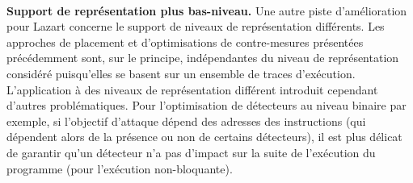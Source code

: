     \paragraph{}
    \textbf{Support de représentation plus bas-niveau.}
    Une autre piste d'amélioration pour Lazart concerne le support de niveaux de représentation différents.
    Les approches de placement et d'optimisations de contre-mesures présentées précédemment sont, sur le principe, indépendantes du niveau de représentation considéré puisqu'elles se basent sur un ensemble de traces d'exécution.
    L'application à des niveaux de représentation différent introduit cependant d'autres problématiques. 
    Pour l'optimisation de détecteurs au niveau binaire par exemple, si l'objectif d'attaque dépend des adresses des instructions (qui dépendent alors de la présence ou non de certains détecteurs), il est plus délicat de garantir qu'un détecteur n'a pas d'impact sur la suite de l'exécution du programme (pour l'exécution non-bloquante).
    